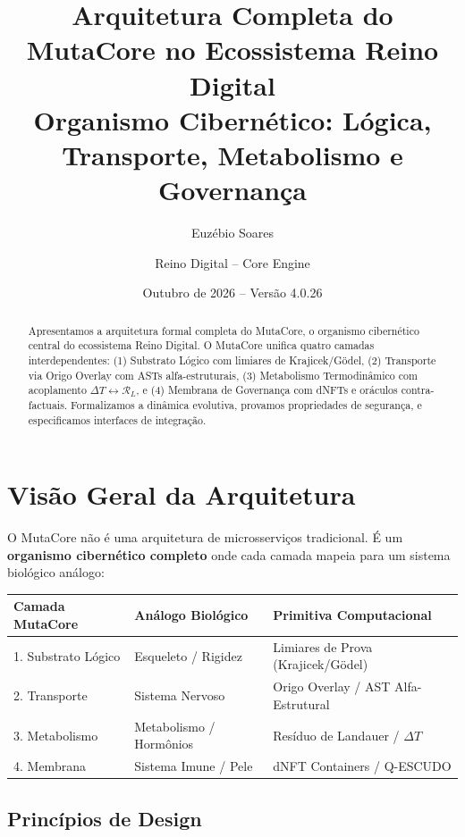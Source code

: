 \documentclass[11pt,a4paper]{article}
\title{
    \vspace{-1cm}
    \textbf{Arquitetura Completa do MutaCore no Ecossistema Reino Digital}\\
    \large Organismo Cibernético: Lógica, Transporte, Metabolismo e Governança
}
\author{Euzébio Soares \and Reino Digital -- Core Engine}
\date{Outubro de 2026 -- Versão 4.0.26}
\newcommand{\DeltaT}{\Delta T}
\newcommand{\RL}{\mathcal{R}_L}
\begin{document}
\maketitle

\begin{abstract}
Apresentamos a arquitetura formal completa do MutaCore, o organismo cibernético central do ecossistema Reino Digital. O MutaCore unifica quatro camadas interdependentes: (1) Substrato Lógico com limiares de Krajicek/Gödel, (2) Transporte via Origo Overlay com ASTs alfa-estruturais, (3) Metabolismo Termodinâmico com acoplamento $\DeltaT \leftrightarrow \RL$, e (4) Membrana de Governança com dNFTs e oráculos contra-factuais. Formalizamos a dinâmica evolutiva, provamos propriedades de segurança, e especificamos interfaces de integração.
\end{abstract}

\tableofcontents
\newpage

\section{Visão Geral da Arquitetura}

O MutaCore não é uma arquitetura de microsserviços tradicional. É um \textbf{organismo cibernético completo} onde cada camada mapeia para um sistema biológico análogo:

\begin{center}
\begin{tabular}{@{}lll@{}}
\toprule
\textbf{Camada MutaCore} & \textbf{Análogo Biológico} & \textbf{Primitiva Computacional} \\
\midrule
1. Substrato Lógico & Esqueleto / Rigidez & Limiares de Prova (Krajicek/Gödel) \\
2. Transporte & Sistema Nervoso & Origo Overlay / AST Alfa-Estrutural \\
3. Metabolismo & Metabolismo / Hormônios & Resíduo de Landauer / $\DeltaT$ \\
4. Membrana & Sistema Imune / Pele & dNFT Containers / Q-ESCUDO \\
\bottomrule
\end{tabular}
\end{center}

\subsection{Princípios de Design}
\end{document}

